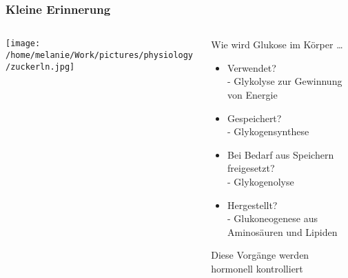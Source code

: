\documentclass{beamer}
\begin{document}
\begin{frame}
\frametitle{Kleine Erinnerung}

\begin{columns}[c]

\begin{column}{5cm}

\begin{center}
\texttt{[image: /home/melanie/Work/pictures/physiology/zuckerln.jpg]}
\end{center}

\end{column}

\begin{column}{5cm}

Wie wird Glukose im Körper \dots

\begin{itemize}
\item
Verwendet? \\ \textcolor{theme}{- Glykolyse zur Gewinnung von Energie}
\item
Gespeichert? \\ \textcolor{theme}{- Glykogensynthese}
\item
Bei Bedarf aus Speichern freigesetzt? \\  \textcolor{theme}{- Glykogenolyse}
\item
Hergestellt? \\ \textcolor{theme}{- Glukoneogenese aus Aminosäuren und Lipiden}
\end{itemize}

\pause
Diese Vorgänge werden hormonell kontrolliert

\end{column}

\end{columns}

\end{frame}
\end{document}

